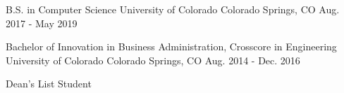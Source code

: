 

\begin{cventries}

  \cventry
    {B.S. in Computer Science} %
    {University of Colorado} %
    {Colorado Springs, CO} %
    {Aug. 2017 - May 2019} %
    {
      \begin{cvitems} %
      \end{cvitems}
    }


  \cventry
    {Bachelor of Innovation in Business Administration, Crosscore in Engineering} %
    {University of Colorado} %
    {Colorado Springs, CO} %
    {Aug. 2014 - Dec. 2016} %
    {
      \begin{cvitems} %
        {Dean's List Student}
      \end{cvitems}
    }
\end{cventries}
